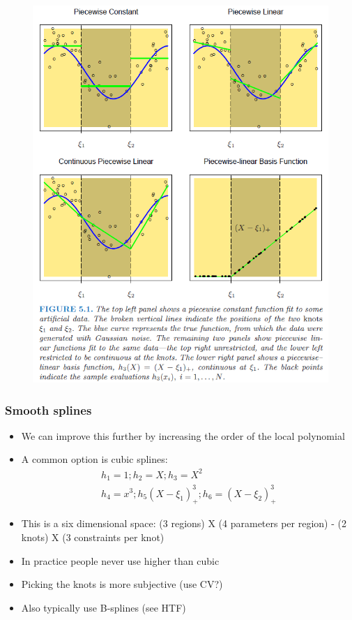 \begin{frame}
  \begin{figure}[htbp]
  \begin{center}
  \includegraphics[height=\textheight]{./resources/ESLPiecewise}
  \end{center}
  \end{figure}
\end{frame}

\begin{frame}
  \frametitle{Smooth splines}
  \begin{itemize}
    \item We can improve this further by increasing the order of the local polynomial
    \item A common option is cubic splines: 
    \begin{eqnarray*}
      h_1 = 1 ;  h_2 = X ; h_3 = X^2 \\
      h_4 = x^ 3 ; h_5 (X- \xi_1)_+^3; h_6 = (X - \xi_2)_+^3 
    \end{eqnarray*} 
    \item This is a six dimensional space: (3 regions) X (4 parameters per region) - (2 knots) X (3 constraints per knot)
    \item In practice people never use higher than cubic
    \item Picking the knots is more subjective (use CV?)
    \item Also typically use B-splines (see HTF)
  \end{itemize}

 \end{frame}

